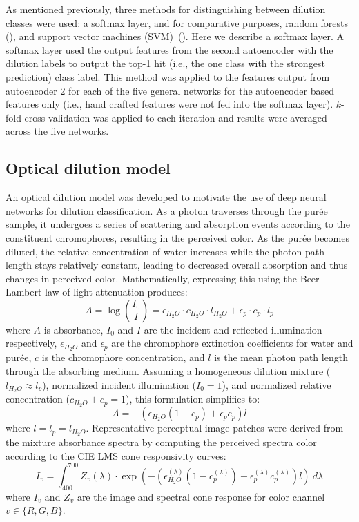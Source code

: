 \documentclass[authoryear]{elsarticle}
\begin{document}
As mentioned previously, three methods for distinguishing between dilution classes were used: a softmax layer, and for comparative purposes, random forests (\cite{breiman2001}), and support vector machines (SVM)~(\cite{cortes1995}). Here we describe a softmax layer. A softmax layer used the output features from the second autoencoder with the dilution labels to output the top-1 hit (i.e., the one class with the strongest prediction) class label. This method was applied to the features output from autoencoder 2 for each of the five general networks for the autoencoder based features only (i.e., hand crafted features were not fed into the softmax layer). $k$-fold cross-validation was applied to each iteration and results were averaged across the five networks.

\subsection{Optical dilution model}\label{ssec:Optical dilution model}

An optical dilution model was developed to motivate the use of deep neural networks for dilution classification. As a photon traverses through the pur\' ee sample, it undergoes a series of scattering and absorption events according to the constituent chromophores, resulting in the perceived color. As the pur\' ee becomes diluted, the relative concentration of water increases while the photon path length stays relatively constant, leading to decreased overall absorption and thus changes in perceived color. Mathematically, expressing this using the Beer-Lambert law of light attenuation produces:
\begin{equation}
A = \log \left( \frac{I_0}{I} \right) = \epsilon_{H_2O} \cdot c_{H_2O} \cdot l_{H_2O} + \epsilon_{p} \cdot c_{p} \cdot l_{p}
\end{equation}
where $A$ is absorbance, $I_0$ and $I$ are the incident and reflected illumination respectively, $\epsilon_{H_2O}$ and $\epsilon_p$ are the chromophore extinction coefficients for water and pur\' ee, $c$ is the chromophore concentration, and $l$ is the mean photon path length through the absorbing medium. Assuming a homogeneous dilution mixture ($l_{H_2O} \approx l_{p}$), normalized incident illumination ($I_0=1$), and normalized relative concentration ($c_{H_2O}+c_{p}=1$), this formulation simplifies to:
\begin{equation}
A = -(\epsilon_{H_2O}(1-c_{p}) + \epsilon_{p}c_{p})l
\label{eq:A}
\end{equation}
where $l=l_{p}=l_{H_2O}$. Representative perceptual image patches were derived from the mixture absorbance spectra by computing the perceived spectra color according to the CIE LMS cone responsivity curves:
\begin{equation}
I_v = \int_{400}^{700} Z_v(\lambda) \cdot \exp\left( -(\epsilon_{H_2O}^{(\lambda)}(1-c_{p}^{(\lambda)}) + \epsilon_{p}^{(\lambda)}c_{p}^{(\lambda)})l \right) ~ d\lambda
\label{eq:I}
\end{equation}
where $I_v$ and $Z_v$ are the image and spectral cone response for color channel $v \in \{R,G,B\}$.
\end{document}
